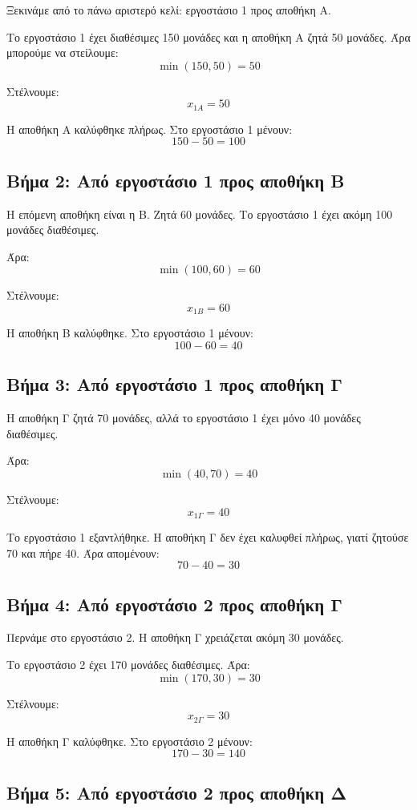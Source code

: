 \documentclass[12pt,a4paper]{article}
\begin{document}
Ξεκινάμε από το πάνω αριστερό κελί: εργοστάσιο 1 προς αποθήκη Α.

Το εργοστάσιο 1 έχει διαθέσιμες 150 μονάδες και η αποθήκη Α ζητά 50 μονάδες. Άρα μπορούμε να στείλουμε:
\[
\min(150,50)=50
\]

Στέλνουμε:
\[
x_{1A}=50
\]

Η αποθήκη Α καλύφθηκε πλήρως. Στο εργοστάσιο 1 μένουν:
\[
150-50=100
\]

\subsection{Βήμα 2: Από εργοστάσιο 1 προς αποθήκη Β}

Η επόμενη αποθήκη είναι η Β. Ζητά 60 μονάδες. Το εργοστάσιο 1 έχει ακόμη 100 μονάδες διαθέσιμες.

Άρα:
\[
\min(100,60)=60
\]

Στέλνουμε:
\[
x_{1B}=60
\]

Η αποθήκη Β καλύφθηκε. Στο εργοστάσιο 1 μένουν:
\[
100-60=40
\]

\subsection{Βήμα 3: Από εργοστάσιο 1 προς αποθήκη Γ}

Η αποθήκη Γ ζητά 70 μονάδες, αλλά το εργοστάσιο 1 έχει μόνο 40 μονάδες διαθέσιμες.

Άρα:
\[
\min(40,70)=40
\]

Στέλνουμε:
\[
x_{1\Gamma}=40
\]

Το εργοστάσιο 1 εξαντλήθηκε. Η αποθήκη Γ δεν έχει καλυφθεί πλήρως, γιατί ζητούσε 70 και πήρε 40. Άρα απομένουν:
\[
70-40=30
\]

\subsection{Βήμα 4: Από εργοστάσιο 2 προς αποθήκη Γ}

Περνάμε στο εργοστάσιο 2. Η αποθήκη Γ χρειάζεται ακόμη 30 μονάδες.

Το εργοστάσιο 2 έχει 170 μονάδες διαθέσιμες. Άρα:
\[
\min(170,30)=30
\]

Στέλνουμε:
\[
x_{2\Gamma}=30
\]

Η αποθήκη Γ καλύφθηκε. Στο εργοστάσιο 2 μένουν:
\[
170-30=140
\]

\subsection{Βήμα 5: Από εργοστάσιο 2 προς αποθήκη Δ}
\end{document}
